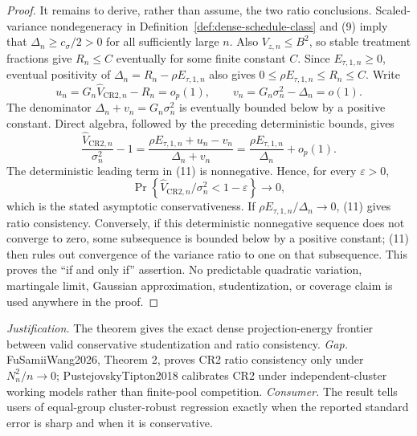 \documentclass{article}
\begin{document}
\begin{proof}
It remains to derive, rather than assume, the two ratio conclusions.  Scaled-variance nondegeneracy in Definition~\ref{def:dense-schedule-class} and (9) imply that \(\Delta_n\ge c_\sigma/2>0\) for all sufficiently large \(n\).  Also \(V_{z,n}\le B^2\), so stable treatment fractions give \(R_n\le C\) eventually for some finite constant \(C\).  Since \(E_{\tau,1,n}\ge0\), eventual positivity of \(\Delta_n=R_n-\rho E_{\tau,1,n}\) also gives \(0\le\rho E_{\tau,1,n}\le R_n\le C\).  Write
\[
 u_n=G_n\widehat V_{\mathrm{CR2},n}-R_n=o_p(1),
 \qquad
 v_n=G_n\sigma_n^2-\Delta_n=o(1).
\]
The denominator \(\Delta_n+v_n=G_n\sigma_n^2\) is eventually bounded below by a positive constant.  Direct algebra, followed by the preceding deterministic bounds, gives
\[
 \frac{\widehat V_{\mathrm{CR2},n}}{\sigma_n^2}-1
 =\frac{\rho E_{\tau,1,n}+u_n-v_n}{\Delta_n+v_n}
 =\frac{\rho E_{\tau,1,n}}{\Delta_n}+o_p(1).
 \tag{11}
\]
The deterministic leading term in (11) is nonnegative.  Hence, for every \(\varepsilon>0\),
\[
 \Pr\!\left\{
   \widehat V_{\mathrm{CR2},n}/\sigma_n^2<1-\varepsilon
 \right\}\longrightarrow0,
\]
which is the stated asymptotic conservativeness.  If \(\rho E_{\tau,1,n}/\Delta_n\to0\), (11) gives ratio consistency.  Conversely, if this deterministic nonnegative sequence does not converge to zero, some subsequence is bounded below by a positive constant; (11) then rules out convergence of the variance ratio to one on that subsequence.  This proves the ``if and only if'' assertion.  No predictable quadratic variation, martingale limit, Gaussian approximation, studentization, or coverage claim is used anywhere in the proof.
\end{proof}
\par\smallskip\noindent \textit{Justification.} The theorem gives the exact dense projection-energy frontier between valid conservative studentization and ratio consistency. \textit{Gap.} FuSamiiWang2026, Theorem 2, proves CR2 ratio consistency only under \(N_n^2/n\to0\); PustejovskyTipton2018 calibrates CR2 under independent-cluster working models rather than finite-pool competition. \textit{Consumer.} The result tells users of equal-group cluster-robust regression exactly when the reported standard error is sharp and when it is conservative.
\end{document}
